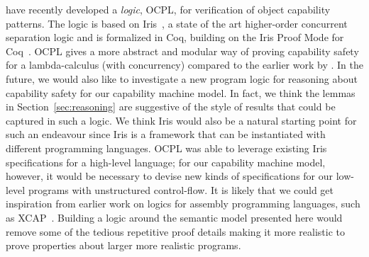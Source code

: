 \documentclass[format=acmsmall, review=true, screen=true]{acmart}
\newenvironment{toplas}%
    {\color{OliveGreen}}{}
\newcommand{\itoplassug}[1]{}
\begin{document}
\citet{swasey:2017} have recently developed a \emph{logic}, OCPL, for verification
of object capability patterns. The logic is based on
Iris~\citep{iris,iris2,iris3}, a state of the art higher-order concurrent
separation logic and is formalized in Coq, building on the Iris Proof Mode for
Coq~\citep{ipm}. OCPL gives a more abstract and modular way of proving
capability safety for a lambda-calculus (with concurrency) compared to the
earlier work by \citet{Devriese:2016ObjCap}.
\begin{toplas}
In the future, we would also like to investigate a new program logic for
reasoning about capability safety for our capability machine model. In fact,
we think the lemmas in Section~\ref{sec:reasoning} are suggestive of the style
of results that could be captured in such a logic. We think Iris would also be
a natural starting point for such an endeavour since Iris is a
framework that can be instantiated with different programming languages. OCPL
was able to leverage existing Iris specifications for a high-level language;
for our capability machine model, however, it would be necessary to devise new
kinds of specifications for our low-level programs with unstructured
control-flow. It is likely that we could get inspiration from earlier work on
logics for assembly programming languages, such as XCAP~\citep{xcap}. Building a logic around the semantic model presented here would remove some of the tedious repetitive proof details making it more realistic to prove properties about larger more realistic programs.
\end{toplas}
\itoplassug{We could further add that this is not the level of abstraction that one would like to reason. One would like to reason about the programs we actually write - that is programs written in high-level languages. If we had a fully-abstract compiler from a nice high-level language to this low-level machine, then we could reason about the program in the high-level language and then because the compiler is fully-abstract, we would retain all the nice properties from the high-level language. How does this work fit in to this picture? The calling convention ensures two properties that we expect our nice high-level languages to have, namely well-bracketedness and local-state encapsulation. If we want to do fully-abstract compilation, then we need some way to guarantee this after compilation. Further, logical relations are often used in full-abstractness proofs. This work expands our knowledge about logical relations should be defined for low-languages and in particular capability machines. (maybe also mention that enforcement necessary for fully-abstract compilation. Could be capability, but it could also be something else - we just need something which we do not have now.)  }
\end{document}
